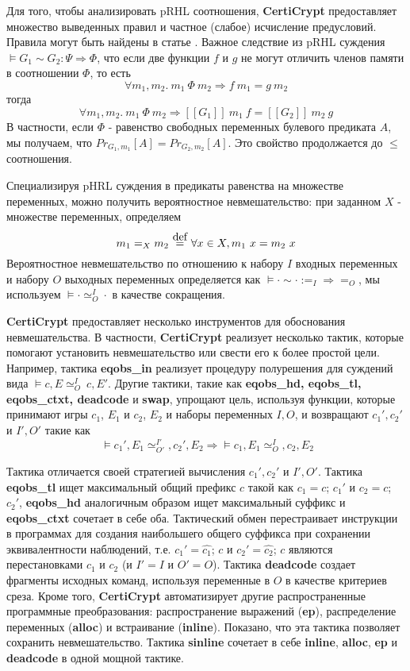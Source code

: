 \documentclass[a4paper,12pt]{report}
\newcommand\myeq{\stackrel{\mathclap{\normalfont\mbox{def}}}{=}}
\begin{document}
\par
Для того, чтобы анализировать pRHL соотношения, \textbf{CertiCrypt} предоставляет множество выведенных правил и частное (слабое) исчисление предусловий. Правила могут быть найдены в статье \cite{1}. Важное следствие из pRHL суждения $\models G_1 \sim G_2 : \Psi \Rightarrow \Phi $, что если две функции $f$ и $g$ не могут отличить членов памяти в соотношении $\Phi$, то есть
\[ \forall m_1, m_2. \  m_1 \ \Phi \  m_2 \Rightarrow f \ m_1 = g \ m_2\]
тогда
\[ \forall m_1, m_2. \ m_1 \ \Phi \ m_2 \Rightarrow [\![G_1]\!] \ m_1 \ f = [\![G_2]\!] \ m_2 \ g\]
В частности, если $\Phi$ - равенство свободных переменных булевого предиката $A$, мы получаем, что $Pr_{G_1,m_1}[A] = Pr_{G_2,m_2}[A]$. Это свойство продолжается до $\leq$ соотношения.
\par
Специализируя pHRL суждения в предикаты равенства на множестве переменных, можно получить вероятностное невмешательство: при заданном $X$ - множестве переменных, определяем
\[ m_1 =_X m_2 \ \myeq \ \forall x \in X, m_1 \ x = m_2 \ x \]
Вероятностное невмешательство по отношению к набору $I$ входных переменных и набору $O$ выходных переменных определяется как $\models \cdot \sim \cdot := _I \Rightarrow = _O$, мы используем $\models \cdot \simeq^{I}_O  \cdot$ в качестве сокращения.
 
\textbf{CertiCrypt} предоставляет несколько инструментов для обоснования невмешательства. В частности, \textbf{CertiCrypt} реализует несколько тактик, которые помогают установить невмешательство или свести его к более простой цели. Например, тактика \textbf{eqobs\_in} реализует процедуру полурешения для суждений вида $\models c , E \simeq^{I}_O \ c, E'$. Другие тактики, такие как \textbf{eqobs\_hd, eqobs\_tl, eqobs\_ctxt, deadcode} и \textbf{swap}, упрощают цель, используя функции, которые принимают игры $c_1$, $E_1$ и $c_2$, $E_2$ и наборы переменных $I, O$, и возвращают $c_1', c_2'$ и $I', O'$ такие как
\[
\ \models c_1', E_1 \simeq^{I'}_{O'}, c_2', E_2 \Rightarrow  \models c_1, E_1 \simeq^{I}_O, c_2, E_2
\]
 
Тактика отличается своей стратегией вычисления $c_1', c_2'$ и $I', O'$. Тактика \textbf{eqobs\_tl} ищет максимальный общий префикс $c$ такой как $c_1 = c$; $c_1'$ и $c_2 = c$; $c_2'$, \textbf{eqobs\_hd} аналогичным образом ищет максимальный суффикс и \textbf{eqobs\_ctxt} сочетает в себе оба. Тактический обмен перестраивает инструкции в программах для создания наибольшего общего суффикса при сохранении эквивалентности наблюдений, т.е. $c_1' = \hat{c_1}$; $c$ и $c_2' = \hat{c_2}$; $c$ являются перестановками $c_1$ и $c_2$ (и $I' = I$ и $O' = O$). Тактика \textbf{deadcode} создает фрагменты исходных команд, используя переменные в $O$ в качестве критериев среза. Кроме того, \textbf{CertiCrypt} автоматизирует другие распространенные программные преобразования: распространение выражений (\textbf{ep}), распределение переменных (\textbf{alloc}) и встраивание (\textbf{inline}). Показано, что эта тактика позволяет сохранить невмешательство. Тактика \textbf{sinline} сочетает в себе \textbf{inline}, \textbf{alloc}, \textbf{ep} и \textbf{deadcode} в одной мощной тактике.
 
\end{document}

